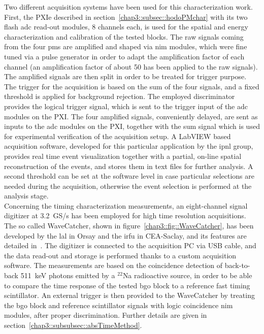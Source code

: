 Two different acquisition systems have been used for this characterization work. First, the PXIe described in section~\ref{chap3::subsec::hodoPMchar} with its two flash \gls{adc} read-out modules, 8 channels each, is used for the spatial and energy characterization and calibration of the tested blocks. The raw signals coming from the four \glspl{pm} are amplified and shaped via \gls{nim} modules, which were fine tuned via a pulse generator in order to adapt the amplification factor of each channel (an amplification factor of about 50 has been applied to the raw signals). The amplified signals are then split in order to be treated for trigger purpose. The trigger for the acquisition is based on the sum of the four signals, and a fixed threshold is applied for background rejection. The employed discriminator provides the logical trigger signal, which is sent to the trigger input of the \gls{adc} modules on the PXI. The four amplified signals, conveniently delayed, are sent as inputs to the \gls{adc} modules on the PXI, together with the sum signal which is used for experimental verification of the acquisition setup. A LabVIEW based acquisition software, developed for this particular application by the \gls{ipnl} group, provides real time event visualization together with a partial, on-line spatial reconstruction of the events, and stores them in text files for further analysis. A second threshold can be set at the software level in case particular selections are needed during the acquisition, otherwise the event selection is performed at the analysis stage.\\
Concerning the timing characterization measurements, an eight-channel signal digitizer at 3.2~GS/s has been employed for high time resolution acquisitions. The so called WaveCatcher, shown in figure~\ref{chap3::fig::WaveCatcher}, has been developed by the \gls{lal} in Orsay and the \gls{irfu} in CEA-Saclay, and its features are detailed in~\cite{Breton2014}. The digitizer is connected to the acquisition PC via USB cable, and the data read-out and storage is performed thanks to a custom acquisition software.  The measurements are based on the coincidence detection of back-to-back 511~keV photons emitted by a $^{22}$Na radioactive source, in order to be able to compare the time response of the tested \gls{bgo} block to a reference fast timing scintillator. An external trigger is then provided to the WaveCatcher by treating the \gls{bgo} block and reference scintillator signals with logic coincidence \gls{nim} modules, after proper discrimination. Further details are given in section~\ref{chap3::subsubsec::absTimeMethod}.

